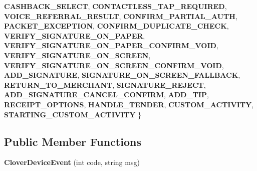 \begin{DoxyCompactItemize}
\newline
{\bfseries C\+A\+S\+H\+B\+A\+C\+K\+\_\+\+S\+E\+L\+E\+CT}, 
{\bfseries C\+O\+N\+T\+A\+C\+T\+L\+E\+S\+S\+\_\+\+T\+A\+P\+\_\+\+R\+E\+Q\+U\+I\+R\+ED}, 
{\bfseries V\+O\+I\+C\+E\+\_\+\+R\+E\+F\+E\+R\+R\+A\+L\+\_\+\+R\+E\+S\+U\+LT}, 
{\bfseries C\+O\+N\+F\+I\+R\+M\+\_\+\+P\+A\+R\+T\+I\+A\+L\+\_\+\+A\+U\+TH}, 
\newline
{\bfseries P\+A\+C\+K\+E\+T\+\_\+\+E\+X\+C\+E\+P\+T\+I\+ON}, 
{\bfseries C\+O\+N\+F\+I\+R\+M\+\_\+\+D\+U\+P\+L\+I\+C\+A\+T\+E\+\_\+\+C\+H\+E\+CK}, 
{\bfseries V\+E\+R\+I\+F\+Y\+\_\+\+S\+I\+G\+N\+A\+T\+U\+R\+E\+\_\+\+O\+N\+\_\+\+P\+A\+P\+ER}, 
{\bfseries V\+E\+R\+I\+F\+Y\+\_\+\+S\+I\+G\+N\+A\+T\+U\+R\+E\+\_\+\+O\+N\+\_\+\+P\+A\+P\+E\+R\+\_\+\+C\+O\+N\+F\+I\+R\+M\+\_\+\+V\+O\+ID}, 
\newline
{\bfseries V\+E\+R\+I\+F\+Y\+\_\+\+S\+I\+G\+N\+A\+T\+U\+R\+E\+\_\+\+O\+N\+\_\+\+S\+C\+R\+E\+EN}, 
{\bfseries V\+E\+R\+I\+F\+Y\+\_\+\+S\+I\+G\+N\+A\+T\+U\+R\+E\+\_\+\+O\+N\+\_\+\+S\+C\+R\+E\+E\+N\+\_\+\+C\+O\+N\+F\+I\+R\+M\+\_\+\+V\+O\+ID}, 
{\bfseries A\+D\+D\+\_\+\+S\+I\+G\+N\+A\+T\+U\+RE}, 
{\bfseries S\+I\+G\+N\+A\+T\+U\+R\+E\+\_\+\+O\+N\+\_\+\+S\+C\+R\+E\+E\+N\+\_\+\+F\+A\+L\+L\+B\+A\+CK}, 
\newline
{\bfseries R\+E\+T\+U\+R\+N\+\_\+\+T\+O\+\_\+\+M\+E\+R\+C\+H\+A\+NT}, 
{\bfseries S\+I\+G\+N\+A\+T\+U\+R\+E\+\_\+\+R\+E\+J\+E\+CT}, 
{\bfseries A\+D\+D\+\_\+\+S\+I\+G\+N\+A\+T\+U\+R\+E\+\_\+\+C\+A\+N\+C\+E\+L\+\_\+\+C\+O\+N\+F\+I\+RM}, 
{\bfseries A\+D\+D\+\_\+\+T\+IP}, 
\newline
{\bfseries R\+E\+C\+E\+I\+P\+T\+\_\+\+O\+P\+T\+I\+O\+NS}, 
{\bfseries H\+A\+N\+D\+L\+E\+\_\+\+T\+E\+N\+D\+ER}, 
{\bfseries C\+U\+S\+T\+O\+M\+\_\+\+A\+C\+T\+I\+V\+I\+TY}, 
{\bfseries S\+T\+A\+R\+T\+I\+N\+G\+\_\+\+C\+U\+S\+T\+O\+M\+\_\+\+A\+C\+T\+I\+V\+I\+TY}
 \}
\end{DoxyCompactItemize}
\subsection*{Public Member Functions}
\begin{DoxyCompactItemize}
\item 
\mbox{\label{classcom_1_1clover_1_1remotepay_1_1sdk_1_1_clover_device_event_a7533454f372bda7cca419525f8fd7133}} 
{\bfseries Clover\+Device\+Event} (int code, string msg)
\end{DoxyCompactItemize}
